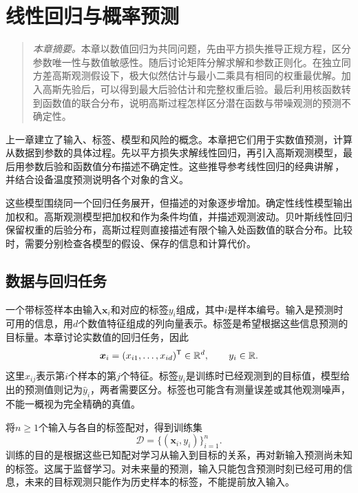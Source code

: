 \chapter{线性回归与概率预测}

\begin{quote}\small
\textit{本章摘要。}本章以数值回归为共同问题，先由平方损失推导正规方程，区分参数唯一性与数值敏感性。随后讨论矩阵分解求解和参数正则化。在独立同方差高斯观测假设下，极大似然估计与最小二乘具有相同的权重最优解。加入高斯先验后，可以得到最大后验估计和完整权重后验。最后利用核函数转到函数值的联合分布，说明高斯过程怎样区分潜在函数与带噪观测的预测不确定性。
\end{quote}

上一章建立了输入、标签、模型和风险的概念。本章把它们用于实数值预测，计算从数据到参数的具体过程。先以平方损失求解线性回归，再引入高斯观测模型，最后用参数后验和函数值分布描述不确定性。这些推导参考线性回归的经典讲解\,\cite{deisenroth2020mml}，并结合设备温度预测说明各个对象的含义。

这些模型围绕同一个回归任务展开，但描述的对象逐步增加。确定性线性模型输出加权和。高斯观测模型把加权和作为条件均值，并描述观测波动。贝叶斯线性回归保留权重的后验分布，高斯过程则直接描述有限个输入处函数值的联合分布。比较时，需要分别检查各模型的假设、保存的信息和计算代价。

\section{数据与回归任务}
一个带标签样本由输入$\bm x_i$和对应的标签$y_i$组成，其中$i$是样本编号。输入是预测时可用的信息，用$d$个数值特征组成的列向量表示。标签是希望根据这些信息预测的目标量。本章讨论实数值的回归任务，因此
\begin{equation}
 \bm x_i=(x_{i1},\ldots,x_{id})^{\mathsf T}\in\mathbb{R}^d,
 \qquad y_i\in\mathbb{R}.
\end{equation}
这里$x_{ij}$表示第$i$个样本的第$j$个特征。标签$y_i$是训练时已经观测到的目标值，模型给出的预测值则记为$\hat y_i$，两者需要区分。标签也可能含有测量误差或其他观测噪声，不能一概视为完全精确的真值。

将$n\geq1$个输入与各自的标签配对，得到训练集
\begin{equation}
 \mathcal D=\{(\bm x_i,y_i)\}_{i=1}^n.
\end{equation}
训练的目的是根据这些已知配对学习从输入到目标的关系，再对新输入预测尚未知的标签。这属于监督学习。对未来量的预测，输入只能包含预测时刻已经可用的信息，未来的目标观测只能作为历史样本的标签，不能提前放入输入。

